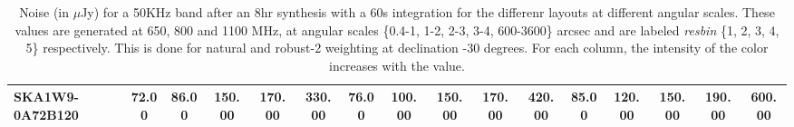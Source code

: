 \begin{table}[!htp]
{{\begin{tabular}{|lccccc||ccccc||ccccc|}
SKA1W9-0A72B120 & 72.00 \cellcolor{blue!31.44} & 86.00 \cellcolor{red!31.20} & 150.00 \cellcolor{green!60.00} & 170.00 \cellcolor{orange!60.00} & 330.00 \cellcolor{purple!60.00} & 76.00 \cellcolor{blue!37.38} & 100.00 \cellcolor{red!42.50} & 150.00 \cellcolor{green!60.00} & 170.00 \cellcolor{orange!60.00} & 420.00 \cellcolor{purple!60.00} & 85.00 \cellcolor{blue!52.59} & 120.00 \cellcolor{red!60.00} & 150.00 \cellcolor{green!60.00} & 190.00 \cellcolor{orange!60.00} & 600.00 \cellcolor{purple!60.00}\\ \hline 
\end{tabular}}
\hspace{1cm} 

\vspace{.0cm}
\caption{Noise (in $\mu$Jy) for a 50KHz band after an 8hr synthesis with a 60s integration for the differenr layouts at different angular scales. These values are generated at 650, 800 and 1100 MHz, at angular scales \{0.4-1, 1-2, 2-3, 3-4, 600-3600\} arcsec and are labeled {\it resbin} \{1, 2, 3, 4, 5\} respectively. This is done for natural and robust-2 weighting at declination -30 degrees. For each column, the intensity of the color increases with the value.}\label{tab:noise50k}}
 \end{table}
